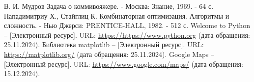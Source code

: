 \begin{thebibliography}{}
    В. И. Мудров Задача о коммивояжере. - Москва: Знание, 1969. - 64 с.
    Пападимитриу Х., Стайглиц К. Комбинаторная оптимизация. Алгоритмы и сложность. - Нью Джерси: PRENTICE-HALL, 1982. - 512 с.
    Welcome to Python -- [Электронный ресурс]. URL: \url{https://https://www.python.org} (дата обращения: 25.11.2024).
    Библиотека matplotlib -- [Электронный ресурс]. URL: \url{https://matplotlib.org/} (дата обращения: 25.11.2024).
    Google Maps -- [Электронный ресурс]. URL: \url{https://www.google.com/maps/} (дата обращения: 15.12.2024).
\end{thebibliography}